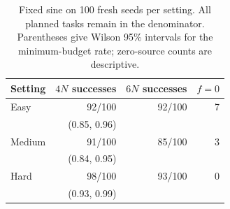 \begin{table}[t]
\caption{Fixed sine on 100 fresh seeds per setting. All planned tasks remain in the denominator. Parentheses give Wilson 95\% intervals for the minimum-budget rate; zero-source counts are descriptive.}
\label{tab:fresh}
\centering\small
\begin{tabular}{@{}lrrr@{}}
\toprule
Setting & $4N$ successes & $6N$ successes & $f=0$\\
\midrule
Easy & 92/100 & 92/100 & 7\\
 & (0.85, 0.96) & & \\
Medium & 91/100 & 85/100 & 3\\
 & (0.84, 0.95) & & \\
Hard & 98/100 & 93/100 & 0\\
 & (0.93, 0.99) & & \\
\bottomrule
\end{tabular}
\end{table}
